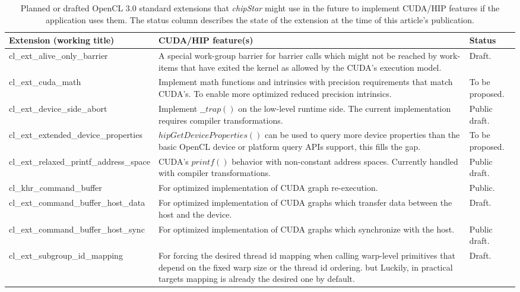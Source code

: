 \documentclass[Afour,sageh,times]{sagej}
\newcommand{\chipstar}{\textit{chipStar}\xspace}
\newcommand{\func}[1]{$#1$\xspace}
\begin{document}
\begin{table}[ht]
    \centering

    \begin{tabular}{|p{5cm}|p{8.7cm}|p{2.3cm}|}
    \hline
\textbf{Extension (working title)} & \textbf{CUDA/HIP feature(s)} & \textbf{Status} \\
    \hline
cl\_ext\_alive\_only\_barrier       & A special work-group barrier for barrier calls which might not be reached by work-items that have exited the kernel as allowed by the CUDA's execution model. & Draft. \\
    \hline
cl\_ext\_cuda\_math     & Implement math functions and intrinsics with precision requirements that match CUDA's. To enable more optimized reduced precision intrinsics. & To be proposed.  \\
    \hline
cl\_ext\_device\_side\_abort        & Implement \func{\_\_trap()} on the low-level runtime side. The current implementation requires compiler transformations. & Public draft.  \\
    \hline
cl\_ext\_extended\_device\_properties & \func{hipGetDeviceProperties()} can be used to query more device properties than the basic OpenCL device or platform query APIs support, this fills the gap. & To be proposed. \\
    \hline
cl\_ext\_relaxed\_printf\_address\_space &  CUDA's \func{printf()}behavior with non-constant address spaces. Currently handled with compiler transformations. & Public draft. \\
   \hline   
cl\_khr\_command\_buffer            & For optimized implementation of CUDA graph re-execution. & Public. \\
    \hline
cl\_ext\_command\_buffer\_host\_data & For optimized implementation of CUDA graphs which transfer data between the host and the device. & Draft. \\
    \hline
cl\_ext\_command\_buffer\_host\_sync & For optimized implementation of CUDA graphs which synchronize with the host. & Public draft. \\
    \hline
cl\_ext\_subgroup\_id\_mapping & For forcing the desired thread id mapping when calling warp-level primitives that depend on the fixed warp size or the thread id ordering. but Luckily, in practical targets mapping is already the desired one by default. & Draft. \\
    \hline

    \end{tabular}
    \caption{Planned or drafted OpenCL 3.0 standard extensions that \chipstar might use in the future to implement CUDA/HIP features if the application uses them. The status column describes the state of the extension at the time of this article's publication. }
    \label{table:proposedExtensions}
\end{table}
\end{document}
